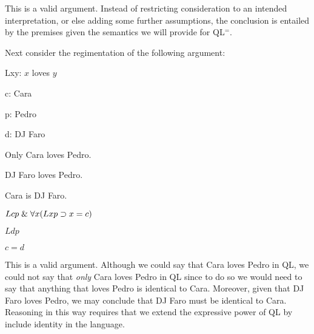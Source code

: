 This is a valid argument.
Instead of restricting consideration to an intended interpretation, or else adding some further assumptions, the conclusion is entailed by the premises given the semantics we will provide for QL$^=$.


Next consider the regimentation of the following argument:

\begin{multicols}{2}

\begin{ekey}
  \item[Lxy:] $x$ loves $y$
  \item[c:] Cara
  \item[p:] Pedro
  \item[d:] DJ Faro
\end{ekey}

\vfill
\strut
\columnbreak

\begin{earg}
  \item[] Only Cara loves Pedro.
  \item[] DJ Faro loves Pedro.
  \item[\therefore] Cara is DJ Faro.
\end{earg}

\begin{earg}
  \item[] $Lcp \mathrel\& \forall x(Lxp \supset x=c)$
  \item[] $Ldp$
  \item[\therefore] $c=d$
\end{earg}

\end{multicols}

This is a valid argument.
Although we could say that Cara loves Pedro in QL, we could not say that \textit{only} Cara loves Pedro in QL since to do so we would need to say that anything that loves Pedro is identical to Cara.
Moreover, given that DJ Faro loves Pedro, we may conclude that DJ Faro must be identical to Cara.
Reasoning in this way requires that we extend the expressive power of QL by include identity in the language.

